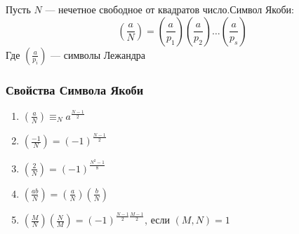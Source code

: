 \begin{definition}
    Пусть \(N\) --- нечетное свободное от квадратов число.Символ Якоби:
    \[\left(\frac{a}{N}\right) = \left(\frac{a}{p_1}\right)\left(\frac{a}{p_2}\right)\dots\left(\frac{a}{p_s}\right)\]
    Где \(\left(\frac{a}{p_i}\right)\) --- символы Лежандра
\end{definition}

\subsubsection{Свойства Символа Якоби}
\begin{enumerate}
    \item \(\left(\frac{a}{N}\right) \equiv_N a^{\frac{N - 1}{2}}\)
    \item \(\left(\frac{-1}{N}\right) = (-1)^{\frac{N - 1}{2}}\)
    \item \(\left(\frac{2}{N}\right) = (-1)^{\frac{N^2 - 1}{8}}\)
    \item \(\left(\frac{ab}{N}\right) = \left(\frac{a}{N}\right)\left(\frac{b}{N}\right)\)
    \item \(\left(\frac{M}{N}\right)\left(\frac{N}{M}\right) = (-1)^{\frac{N - 1}{2}\frac{M - 1}{2}}\), если \((M, N) = 1\)
\end{enumerate}

